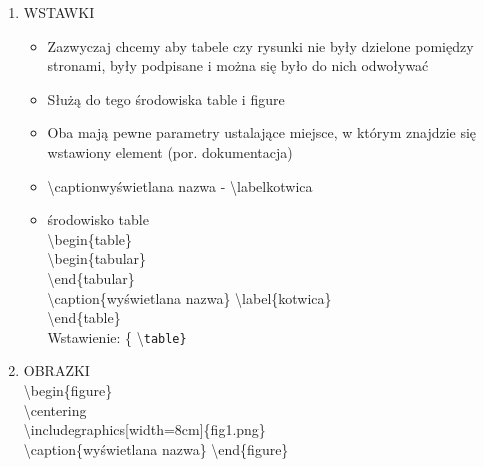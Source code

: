 \documentclass[a4paper,twoside,onecolumn]{report}
\begin{document}
\begin{enumerate}
			\item WSTAWKI
			\begin{itemize}
				\item Zazwyczaj chcemy aby tabele czy rysunki nie były dzielone pomiędzy stronami, były podpisane i można się było do nich odwoływać
				\item Służą do tego środowiska table i figure
				\item Oba mają pewne parametry ustalające miejsce, w którym znajdzie się wstawiony element (por. dokumentacja)
				\item \textbackslash caption{wyświetlana nazwa} - \textbackslash label{kotwica}
				\item środowisko table \\
					\textbackslash begin\{table\}\\
						\textbackslash begin\{tabular\}\\
						\textbackslash end\{tabular\}\\
						\textbackslash caption\{wyświetlana nazwa\} \textbackslash label\{kotwica\}\\
					\textbackslash end\{table\}\\
					Wstawienie: \{ \textbackslash \tt table\}
			\end{itemize}

			\item OBRAZKI\\
				\textbackslash begin\{figure\}\\
					\textbackslash centering \\
					\textbackslash includegraphics[width=8cm]\{fig1.png\}\\
					\textbackslash caption\{wyświetlana nazwa\}
				\textbackslash end\{figure\}\\


\end{enumerate}
\end{document}
